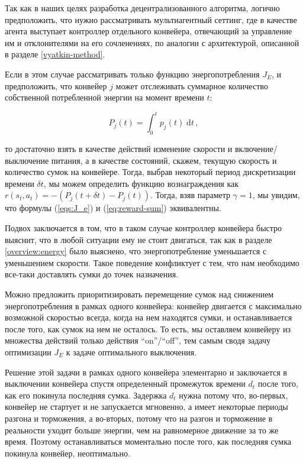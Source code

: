 \documentclass[specification,annotation,times]{itmo-student-thesis}
\theoremstyle{definition}
\begin{document}
Так как в наших целях разработка децентрализованного алгоритма, логично
предположить, что нужно рассматривать мультиагентный сеттинг, где в качестве
агента выступает контроллер отдельного конвейера, отвечающий за управление им и
отклонителями на его сочленениях, по аналогии с архитектурой, описанной в
разделе \ref{vyatkin-method}.

Если в этом случае рассматривать только функцию
энергопотребления $J_E$, и предположить, что конвейер $j$ может отслеживать
суммарное количество собственной потребленной энергии на момент времени $t$:

\begin{equation}
  P_j(t) = \int_0^t \! p_j(t) \; \mathrm{d}t \,,
\end{equation}

то достаточно взять в качестве действий изменение скорости и
включение/выключение питания, а в качестве состояний, скажем, текущую скорость и
количество сумок на конвейере. Тогда, выбрав некоторый период дискретизации
времени $\delta t$, мы можем определить функцию вознаграждения как
$r(s_t, a_t) = - (P_j(t + \delta t) - P_j(t))$. Тогда, взяв параметр
$\gamma = 1$, мы увидим, что формулы (\ref{eqs:J_e}) и (\ref{eq:reward-sum})
эквивалентны.

Подвох заключается в том, что в таком случае контроллер конвейера быстро
выяснит, что в любой ситуации ему не стоит двигаться, так как в разделе
\ref{overview:energy} было выяснено, что энергопотребление уменьшается с
уменьшением скорости. Такое поведение конфликтует с тем, что нам необходимо
все-таки доставлять сумки до точек назначения.

Можно предложить приоритизировать перемещение сумок над снижением
энергопотребления в рамках одного конвейера: конвейер двигается с максимально
возможной скоростью всегда, когда на нем находятся сумки, и останавливается
после того, как сумок на нем не осталось. То есть, мы оставляем конвейеру из
множества действий только действия ``on''/``off'', тем самым сводя задачу
оптимизации $J_E$ к задаче оптимального выключения.

Решение этой задачи в рамках одного конвейера элементарно и заключается в
выключении конвейера спустя определенный промежуток времени $d_t$ после того,
как его покинула последняя сумка. Задержка $d_t$ нужна потому что, во-первых,
конвейер не стартует и не запускается мгновенно, а имеет некоторые периоды
разгона и торможения, а во-вторых, потому что на разгон и торможение в
реальности уходит больше энергии, чем на равномерное движение за то же время.
Поэтому останавливаться моментально после того, как последняя сумка покинула
конвейер, неоптимально.
\end{document}
